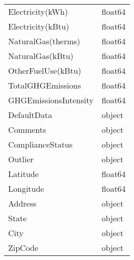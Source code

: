 \begin{tabular}{ll}
Electricity(kWh)                &   float64 \\
Electricity(kBtu)               &   float64 \\
NaturalGas(therms)              &   float64 \\
NaturalGas(kBtu)                &   float64 \\
OtherFuelUse(kBtu)              &   float64 \\
TotalGHGEmissions               &   float64 \\
GHGEmissionsIntensity           &   float64 \\
DefaultData                     &    object \\
Comments                        &    object \\
ComplianceStatus                &    object \\
Outlier                         &    object \\
Latitude                        &   float64 \\
Longitude                       &   float64 \\
Address                         &    object \\
State                           &    object \\
City                            &    object \\
ZipCode                         &    object \\
\bottomrule
\end{tabular}

